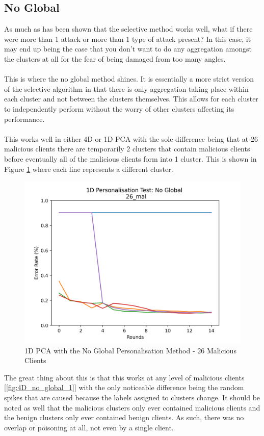 \subsection{No Global}
As much as has been shown that the selective method works well, what if there were more than 1 attack or more than 1 type of attack present?
In this case, it may end up being the case that you don't want to do any aggregation amongst the clusters at all for the fear of being damaged from too many angles.
\\ \\
This is where the no global method shines.
It is essentially a more strict version of the selective algorithm in that there is only aggregation taking place within each cluster and not between the clusters themselves.
This allows for each cluster to independently perform without the worry of other clusters affecting its performance.
\\ \\
This works well in either 4D or 1D PCA with the sole difference being that at 26 malicious clients there are temporarily 2 clusters that contain malicious clients before eventually all of the malicious clients form into 1 cluster.
This is shown in Figure \ref{fig:1D_no_global} where each line represents a different cluster.
\begin{figure}[htbp]
	\centering
    \includegraphics[scale=0.5]{my_agg/graphs/1d_no_global.png}
    \caption{1D PCA with the No Global Personalisation Method - 26 Malicious Clients}
	\label{fig:1D_no_global}
\end{figure}
The great thing about this is that this works at any level of malicious clients [\ref{fig:4D_no_global_1}] with the only noticeable difference being the random spikes that are caused because the labels assigned to clusters change.
It should be noted as well that the malicious clusters only ever contained malicious clients and the benign clusters only ever contained benign clients.
As such, there was no overlap or poisoning at all, not even by a single client.

